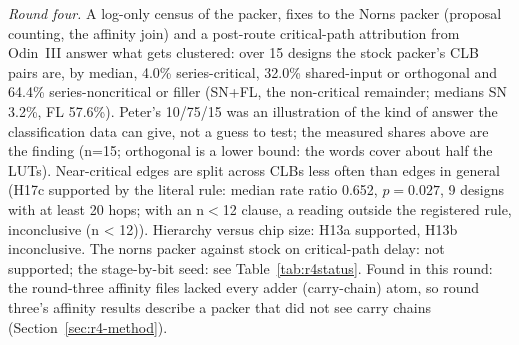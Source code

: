 
\par\smallskip\noindent\emph{Round four.} A log-only census of the packer, fixes to the Norns packer (proposal counting, the
affinity join) and a post-route critical-path attribution from Odin~III answer what gets clustered: over 15 designs the stock
packer's CLB pairs are, by median, 4.0\% series-critical, 32.0\% shared-input or orthogonal and
64.4\% series-noncritical or filler (SN+FL, the non-critical remainder; medians SN 3.2\%, FL 57.6\%).
Peter's 10/75/15 was an illustration of the kind of answer the classification data can give, not a guess to test; the measured shares above are the finding (n=15; orthogonal is a lower bound: the words cover about half the LUTs).
Near-critical edges are split across CLBs less often than edges in general (H17c supported by the literal rule: median rate ratio 0.652, $p=0.027$, 9 designs with at least 20 hops; with an n$<$12 clause, a reading outside the registered rule, inconclusive (n < 12)).
Hierarchy versus chip size: H13a supported, H13b inconclusive. The norns packer against stock on critical-path delay: not supported; the stage-by-bit seed: see Table~\ref{tab:r4status}.
Found in this round: the round-three affinity files lacked every adder (carry-chain) atom, so round three's affinity results describe a packer that did not see carry chains (Section~\ref{sec:r4-method}).
